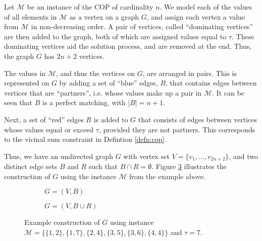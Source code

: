 \documentclass[oribibl]{llncs}
\begin{document}
Let $\mathcal{M}$ be an instance of the COP of cardinality $n$. We model each of the values of all elements in $\mathcal{M}$ as a vertex on a graph $G$, and assign each vertex a value from $\mathcal{M}$ in non-decreasing order. A pair of vertices, called ``dominating vertices'' are then added to the graph, both of which are assigned values equal to $\tau$. These dominating vertices aid the solution process, and are removed at the end. Thus, the graph $G$ has $2n+2$ vertices.

The values in $\mathcal{M}$, and thus the vertices on $G$, are arranged in pairs. This is represented on $G$ by adding a set of ``blue'' edges, $B$, that contains edges between vertices that are ``partners'', i.e. whose values make up a pair in $\mathcal{M}$. It can be seen that $B$ is a perfect matching, with $|B|= n+1$.

Next, a set of ``red'' edges $R$ is added to $G$ that consists of edges between vertices whose values equal or exceed $\tau$, provided they are not partners. This corresponds to the vicinal sum constraint in Defintion \ref{defn:cop}. 

Thus, we have an undirected graph $G$ with vertex set $V = \{v_1, ..., v_{2n+2}\}$, and two distinct edge sets $B$ and $R$ such that $B \cap R = \emptyset$. Figure \ref{fig:partners/threshold} illustrates the construction of $G$ using the instance $\mathcal{M}$ from the example above.

\begin{figure}	
\centering
\begin{subfigure}[h]{0.45\textwidth}
	
	\caption{$G = (V, B)$}	
	\label{fig:partners}
\end{subfigure} \hspace{40pt}
\begin{subfigure}[h]{0.45\textwidth}
	
	\caption{$G=(V, B \cup R)$}	
	\label{fig:threshold}
\end{subfigure}
\caption{Example construction of $G$ using instance $\mathcal{M} = \{\{1,2\}, \{1,7\}, \{2,4\}, \{3,5\}, \{3,6\}, \{4,4\}\}$ and $\tau = 7$.}
\label{fig:partners/threshold}
\end{figure}
\end{document}
